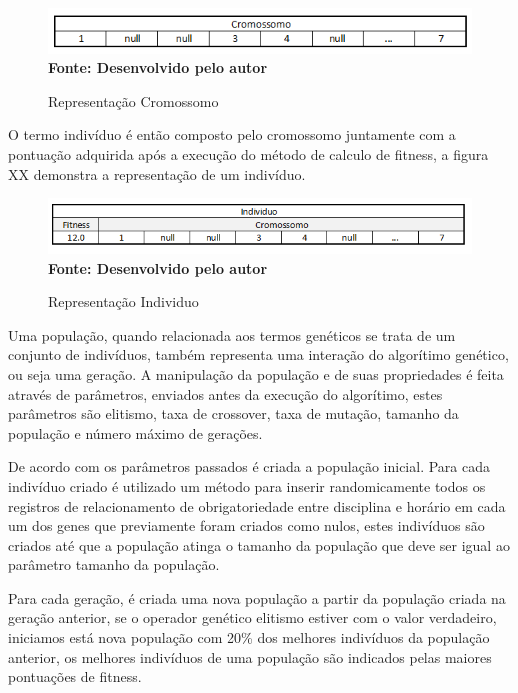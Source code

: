 \begin{figure}[!htb]
\caption[Representação Cromossomo]{Representação Cromossomo}
\label{fig:figura6}
\centering
\includegraphics[scale=0.8]{imagens/representacaoCromossomo.png}
\\ \textbf{\footnotesize Fonte: Desenvolvido pelo autor}
\end{figure}

O termo indivíduo é então composto pelo cromossomo juntamente com a pontuação adquirida após a execução do método de calculo de fitness, a figura XX demonstra a representação de um indivíduo.\par

\begin{figure}[!htb]
\caption[Representação Individuo]{Representação Individuo}
\label{fig:figura7}
\centering
\includegraphics[scale=0.8]{imagens/representacaoIndividuo.png}
\\ \textbf{\footnotesize Fonte: Desenvolvido pelo autor}
\end{figure}


Uma população, quando relacionada aos termos genéticos se trata de um conjunto de indivíduos, também representa uma interação do algorítimo genético, ou seja uma geração. A manipulação da população e de suas propriedades é feita através de parâmetros, enviados antes da execução do algorítimo, estes parâmetros são elitismo, taxa de crossover, taxa de mutação, tamanho da população e número máximo de gerações.

De acordo com os parâmetros passados é criada a população inicial. Para cada indivíduo criado é utilizado um método para inserir randomicamente todos os registros de relacionamento de obrigatoriedade entre disciplina e horário em cada um dos genes que previamente foram criados como nulos, estes indivíduos são criados até que a população atinga o tamanho da população que deve ser igual ao parâmetro tamanho da população.\par

Para cada geração, é criada uma nova população a partir da população criada na geração anterior, se o operador genético elitismo estiver com o valor verdadeiro, iniciamos está nova população com 20\% dos melhores indivíduos da população anterior, os melhores indivíduos de uma população são indicados pelas maiores pontuações de fitness.\par

